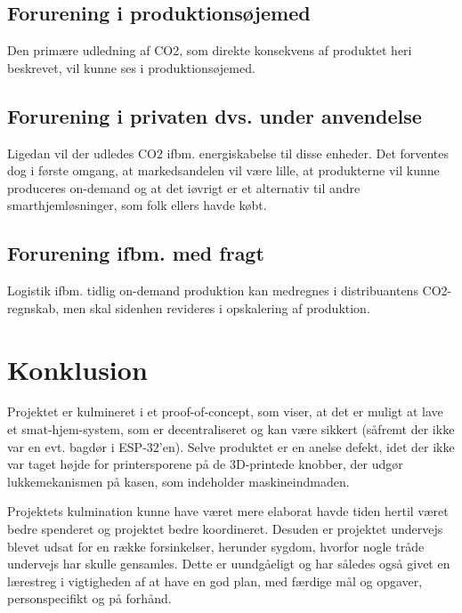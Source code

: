 \documentclass[11pt]{article}
\begin{document}
\subsection{Forurening i produktionsøjemed}
Den primære udledning af CO2, som direkte konsekvens af produktet heri beskrevet, vil kunne ses i produktionsøjemed.
\subsection{Forurening i privaten dvs. under anvendelse}
Ligedan vil der udledes CO2 ifbm. energiskabelse til disse enheder. Det forventes dog i første omgang, at markedsandelen vil være lille, at produkterne vil kunne produceres on-demand og at det iøvrigt er et alternativ til andre smarthjemløsninger, som folk ellers havde købt.
\subsection{Forurening ifbm. med fragt}
Logistik ifbm. tidlig on-demand produktion kan medregnes i distribuantens CO2-regnskab, men skal sidenhen revideres i opskalering af produktion. 

\newpage
\section{Konklusion}
\label{sec:org7454aed}
Projektet er kulmineret i et proof-of-concept, som viser, at det er muligt at lave et smat-hjem-system, som er decentraliseret og kan være sikkert (såfremt der ikke var en evt. bagdør i ESP-32'en). Selve produktet er en anelse defekt, idet der ikke var taget højde for printersporene på de 3D-printede knobber, der udgør lukkemekanismen på kasen, som indeholder maskineindmaden.

Projektets kulmination kunne have været mere elaborat havde tiden hertil været bedre spenderet og projektet bedre koordineret. Desuden er projektet undervejs blevet udsat for en række forsinkelser, herunder sygdom, hvorfor nogle tråde undervejs har skulle gensamles. Dette er uundgåeligt og har således også givet en lærestreg i vigtigheden af at have en god plan, med færdige mål og opgaver, personspecifikt og på forhånd.

\newpage
\printbibliography
\end{document}
